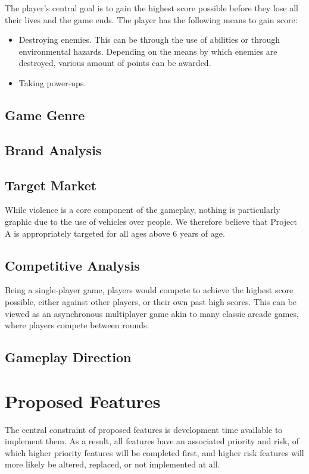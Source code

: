 \documentclass{article}
\newcommand{\name}{Project A}
\theoremstyle{definition}
\begin{document}
The player's central goal is to gain the highest score possible before they
lose all their lives and the game ends. %
The player has the following means to gain score:
\begin{itemize}
  \item Destroying enemies. This can be through the use of abilities or through
    environmental hazards. Depending on the means by which enemies are
    destroyed, various amount of points can be awarded.
  \item Taking power-ups.
\end{itemize}

\subsection{Game Genre}
\subsection{Brand Analysis}
\subsection{Target Market}

While violence is a core component of the gameplay, nothing is particularly
graphic due to the use of vehicles over people. We therefore believe that
\name{} is appropriately targeted for all ages above 6 years of age.

\subsection{Competitive Analysis}

Being a single-player game, players would compete to achieve the highest score
possible, either against other players, or their own past high scores. This can
be viewed as an asynchronous multiplayer game akin to many classic arcade
games, where players compete between rounds.

\subsection{Gameplay Direction}
\section{Proposed Features}

The central constraint of proposed features is development time available to
implement them. As a result, all features have an associated priority and risk,
of which higher priority features will be completed first, and higher risk
features will more likely be altered, replaced, or not implemented at all.
\end{document}
